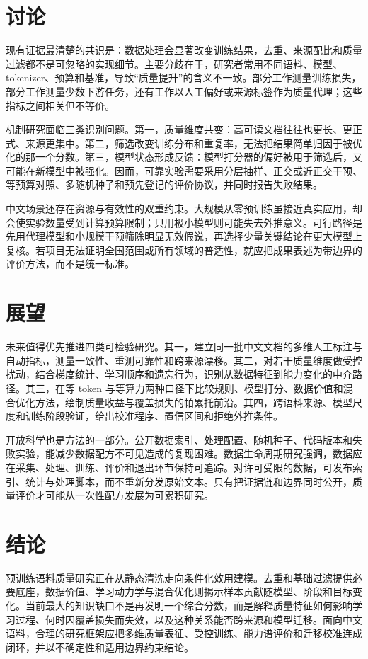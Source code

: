 \documentclass[11pt,a4paper]{article}
\begin{document}
\section{讨论}

现有证据最清楚的共识是：数据处理会显著改变训练结果，去重、来源配比和质量过滤都不是可忽略的实现细节。主要分歧在于，研究者常用不同语料、模型、tokenizer、预算和基准，导致“质量提升”的含义不一致。部分工作测量训练损失，部分工作测量少数下游任务，还有工作以人工偏好或来源标签作为质量代理；这些指标之间相关但不等价。

机制研究面临三类识别问题。第一，质量维度共变：高可读文档往往也更长、更正式、来源更集中。第二，筛选改变训练分布和重复率，无法把结果简单归因于被优化的那一个分数。第三，模型状态形成反馈：模型打分器的偏好被用于筛选后，又可能在新模型中被强化。因而，可靠实验需要采用分层抽样、正交或近正交干预、等预算对照、多随机种子和预先登记的评价协议，并同时报告失败结果。

中文场景还存在资源与有效性的双重约束。大规模从零预训练虽接近真实应用，却会使实验数量受到计算预算限制；只用极小模型则可能失去外推意义。可行路径是先用代理模型和小规模干预筛除明显无效假说，再选择少量关键结论在更大模型上复核。若项目无法证明全国范围或所有领域的普适性，就应把成果表述为带边界的评价方法，而不是统一标准。

\section{展望}

未来值得优先推进四类可检验研究。其一，建立同一批中文文档的多维人工标注与自动指标，测量一致性、重测可靠性和跨来源漂移。其二，对若干质量维度做受控扰动，结合梯度统计、学习顺序和遗忘行为，识别从数据特征到能力变化的中介路径。其三，在等 token 与等算力两种口径下比较规则、模型打分、数据价值和混合优化方法，绘制质量收益与覆盖损失的帕累托前沿。其四，跨语料来源、模型尺度和训练阶段验证，给出校准程序、置信区间和拒绝外推条件。

开放科学也是方法的一部分。公开数据索引、处理配置、随机种子、代码版本和失败实验，能减少数据配方不可见造成的复现困难。数据生命周期研究强调，数据应在采集、处理、训练、评价和退出环节保持可追踪\cite{adatacentric2025}。对许可受限的数据，可发布索引、统计与处理脚本，而不重新分发原始文本。只有把证据链和边界同时公开，质量评价才可能从一次性配方发展为可累积研究。

\section{结论}

预训练语料质量研究正在从静态清洗走向条件化效用建模。去重和基础过滤提供必要底座，数据价值、学习动力学与混合优化则揭示样本贡献随模型、阶段和目标变化。当前最大的知识缺口不是再发明一个综合分数，而是解释质量特征如何影响学习过程、何时因覆盖损失而失效，以及这种关系能否跨来源和模型迁移。面向中文语料，合理的研究框架应把多维质量表征、受控训练、能力谱评价和迁移校准连成闭环，并以不确定性和适用边界约束结论。



\end{document}
